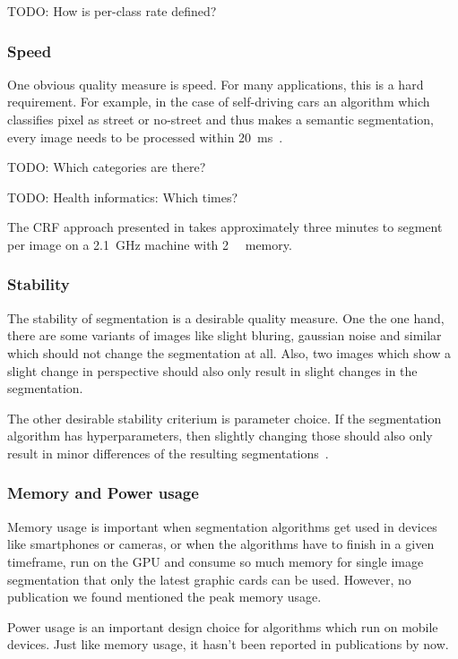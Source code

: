 TODO: How is per-class rate defined?


\subsubsection{Speed}\label{subsubsec:speed-quality-measure}
One obvious quality measure is speed. For many applications, this is a hard
requirement. For example, in the case of self-driving cars an algorithm which
classifies pixel as street or no-street and thus makes a semantic segmentation,
every image needs to be processed within
\SI{20}{\milli\second}~\cite{bittel2015pixel}.

TODO: Which categories are there?

TODO: Health informatics: Which times?

The \gls{CRF} approach presented in \cite{shotton2006textonboost} takes
approximately three minutes to segment per image on a \SI{2.1}{\giga\hertz}
machine with \SI{2}{\giga\byte} memory.


\subsubsection{Stability}\label{subsubsec:stability-quality-measure}
The stability of segmentation is a desirable quality measure. One the one hand,
there are some variants of images like slight bluring, gaussian noise and
similar which should not change the segmentation at all. Also, two images which
show a slight change in perspective should also only result in slight changes
in the segmentation.\cite{pantofaru2005comparison}

The other desirable stability criterium is parameter choice. If the
segmentation algorithm has hyperparameters, then slightly changing those should
also only result in minor differences of the resulting segmentations~\cite{pantofaru2005comparison}.


\subsubsection{Memory and Power usage}

Memory usage is important when segmentation algorithms get used in devices like
smartphones or cameras, or when the algorithms have to finish in a given
timeframe, run on the \gls{GPU} and consume so much memory for single image
segmentation that only the latest graphic cards can be used. However, no
publication we found mentioned the peak memory usage.

Power usage is an important design choice for algorithms which run on mobile
devices. Just like memory usage, it hasn't been reported in publications by
now.

